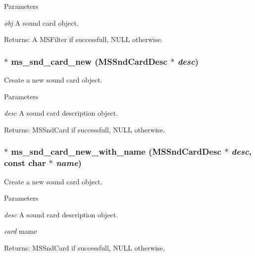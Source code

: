 \begin{DoxyParams}{Parameters}
\item[{\em obj}]A sound card object.\end{DoxyParams}
Returns: A MSFilter if successfull, NULL otherwise. 
\subsubsection[{ms\_\-snd\_\-card\_\-new}]{$\ast$ ms\_\-snd\_\-card\_\-new ({\bf MSSndCardDesc} $\ast$ {\em desc})}\label{group__mediastreamer2__soundcardfilter_ga10b0988ae644d95a96d36f61da12353e}
Create a new sound card object.


\begin{DoxyParams}{Parameters}
\item[{\em desc}]A sound card description object.\end{DoxyParams}
Returns: MSSndCard if successfull, NULL otherwise. 
\subsubsection[{ms\_\-snd\_\-card\_\-new\_\-with\_\-name}]{$\ast$ ms\_\-snd\_\-card\_\-new\_\-with\_\-name ({\bf MSSndCardDesc} $\ast$ {\em desc}, \/  const char $\ast$ {\em name})}\label{group__mediastreamer2__soundcardfilter_gaf24956c9ec67d11de53e5f866bdbdf80}
Create a new sound card object.


\begin{DoxyParams}{Parameters}
\item[{\em desc}]A sound card description object. \item[{\em card}]mame\end{DoxyParams}
Returns: MSSndCard if successfull, NULL otherwise. 
